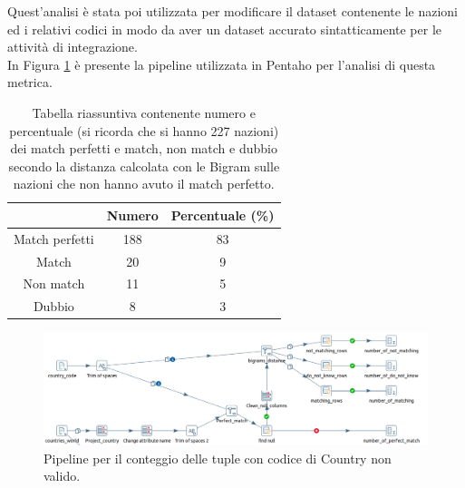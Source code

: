 Quest'analisi è stata poi utilizzata per modificare il dataset contenente le nazioni ed i relativi codici in modo da aver un dataset accurato sintatticamente per le attività di integrazione.\\
In Figura \ref{fig:dqcountrycodeaccuracy} è presente la pipeline utilizzata in Pentaho per l'analisi di questa metrica.
\begin{table}
	\caption{Tabella riassuntiva contenente numero e percentuale (si ricorda che si hanno 227 nazioni) dei match perfetti e match, non match e dubbio secondo la distanza calcolata con le Bigram sulle nazioni che non hanno avuto il match perfetto.}
	
	\label{tab:matches}
	
	\centering
	\begin{tabular}{|c|c|c|}
		\hline
		 & \textbf{Numero} & \textbf{Percentuale (\%)} \\ 
		\hline  
		\rule{0pt}{13pt}Match perfetti & 188 & 83 \\ 
		\hline  
		\rule{0pt}{13pt}Match & 20 & 9 \\ 
		\hline  
		\rule{0pt}{13pt}Non match & 11 & 5 \\ 
		\hline  
		\rule{0pt}{13pt}Dubbio & 8 & 3 \\ 
		\hline   
	\end{tabular}
\end{table} 

\begin{figure}[h!]
	\centering
	\includegraphics[width=0.7\linewidth]{images/DQ_countrycodeaccuracy}
	\caption{Pipeline per il conteggio delle tuple con codice di Country non valido.}
	\label{fig:dqcountrycodeaccuracy}
\end{figure}

